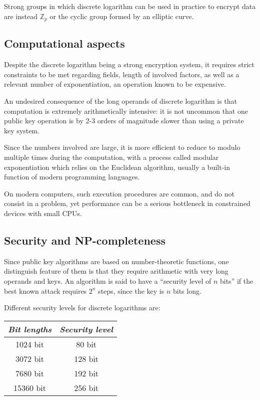 Strong groups in which discrete logarithm can be used in practice to encrypt data are instead $\mathbb{Z}_p$ or the cyclic group formed by an elliptic curve.

\subsection{Computational aspects}
Despite the discrete logarithm being a strong encryption system, it requires strict constraints to be met regarding fields, length of involved factors, as well as a relevant number of exponentiation, an operation known to be expensive.

An undesired consequence of the long operands of discrete logarithm is that computation is extremely arithmetically intensive: it is not uncommon that one public key operation is by 2-3 orders of magnitude slower than using a private key system. 

Since the numbers involved are large, it is more efficient to reduce to modulo multiple times during the computation, with a process called modular exponentiation which relies on the Euclidean algorithm, usually a built-in function of modern programming languages. 

On modern computers, such execution procedures are common, and do not consist in a problem, yet performance can be a serious bottleneck in constrained devices with small CPUs.

\subsection{Security and NP-completeness}
Since public key algorithms are based on number-theoretic functions, one distinguish feature of them is that they require arithmetic with very long operands and keys. An algorithm is said to have a ``security level of $n$ bits'' if the best known attack requires $2^n$ steps, since the key is $n$ bits long.

Different security levels for discrete logarithms are:
\begin{table}[h]
	\centering
	\begin{tabular}{c|c}
		\textit{Bit lengths} & \textit{Security level} \\
		\hline
		1024 bit & 80 bit \\
		\hline
		3072 bit & 128 bit \\
		\hline
		7680 bit & 192 bit \\
		\hline
		15360 bit & 256 bit
	\end{tabular}
\end{table}

